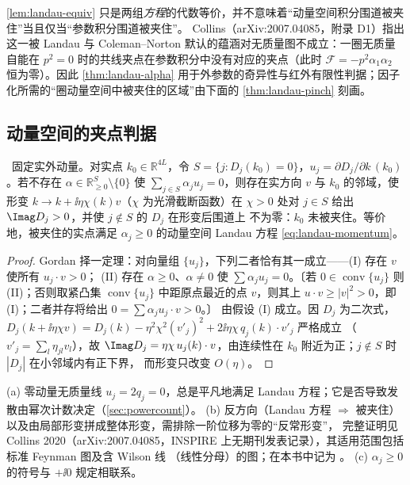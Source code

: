 \begin{remark}
\cref{lem:landau-equiv} 只是两组\emph{方程}的代数等价，并不意味着“动量空间积分围道被夹住”当且仅当“参数积分围道被夹住”。
Collins（arXiv:2007.04085，附录 D1）指出这一被 Landau 与 Coleman--Norton 默认的蕴涵对无质量图不成立：一圈无质量自能在
$p^2=0$ 时的共线夹点在参数积分中没有对应的夹点（此时 $\mathcal F=-p^2\alpha_1\alpha_2$ 恒为零）。因此
\cref{thm:landau-alpha} 用于外参数的奇异性与红外有限性判据；因子化所需的“圈动量空间中被夹住的区域”由下面的
\cref{thm:landau-pinch} 刻画。
\end{remark}

\subsection{动量空间的夹点判据}

\begin{theorem}[被夹点的必要条件]\label{thm:landau-pinch}\tagR\
固定实外动量。对实点 $k_0\in\mathbb R^{4L}$，令 $S=\{j:D_j(k_0)=0\}$，$u_j=\partial D_j/\partial k\,(k_0)$。若不存在
$\alpha\in\mathbb R^{S}_{\ge0}\setminus\{0\}$ 使 $\sum_{j\in S}\alpha_ju_j=0$，则存在实方向 $v$ 与 $k_0$ 的邻域，使形变
$k\to k+\ii\eta\chi(k)v$（$\chi$ 为光滑截断函数）在 $\chi>0$ 处对 $j\in S$ 给出 $\Imag D_j>0$，并使 $j\notin S$ 的 $D_j$ 在形变后围道上
不为零：$k_0$ 未被夹住。等价地，被夹住的实点满足 $\alpha_j\ge0$ 的动量空间 Landau 方程 \cref{eq:landau-momentum}。
\end{theorem}
\begin{proof}
Gordan 择一定理：对向量组 $\{u_j\}$，下列二者恰有其一成立——(I) 存在 $v$ 使所有 $u_j\cdot v>0$；
(II) 存在 $\alpha\ge0$、$\alpha\ne0$ 使 $\sum\alpha_ju_j=0$。〔若 $0\in\operatorname{conv}\{u_j\}$ 则 (II)；否则取紧凸集
$\operatorname{conv}\{u_j\}$ 中距原点最近的点 $v$，则其上 $u\cdot v\ge|v|^2>0$，即 (I)；二者并存将给出 $0=\sum\alpha_ju_j\cdot v>0$。〕
由假设 (I) 成立。因 $D_j$ 为二次式，$D_j(k+\ii\eta\chi v)=D_j(k)-\eta^2\chi^2(v'_j)^2+2\ii\eta\chi\,q_j(k)\cdot v'_j$ 严格成立
（$v'_j=\sum_l\eta_{jl}v_l$），故 $\Imag D_j=\eta\chi\,u_j(k)\cdot v$，由连续性在 $k_0$ 附近为正；$j\notin S$ 时 $|D_j|$ 在小邻域内有正下界，
而形变只改变 $O(\eta)$。
\end{proof}

\begin{remark}
(a) 零动量无质量线 $u_j=2q_j=0$，总是平凡地满足 Landau 方程；它是否导致发散由幂次计数决定（\cref{sec:powercount}）。
(b) 反方向（Landau 方程 $\Rightarrow$ 被夹住）以及由局部形变拼成整体形变，需排除一阶位移为零的“反常形变”，
完整证明见 Collins 2020（arXiv:2007.04085，INSPIRE 上无期刊发表记录），其适用范围包括标准 Feynman 图及含 Wilson 线
（线性分母）的图；在本书中记为 \tagA。
(c) $\alpha_j\ge0$ 的符号与 $+\ii0$ 规定相联系。
\end{remark}

